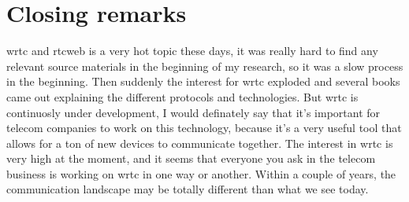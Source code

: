 \section{Closing remarks}
\gls{wrtc} and \gls{rtcweb} is a very hot topic these days, it was really hard to find any relevant source materials in the beginning of my research, so it was a slow process in the beginning. Then suddenly the interest for \gls{wrtc} exploded and several books came out explaining the different protocols and technologies. But \gls{wrtc} is continuosly under development, I would definately say that it's important for telecom companies to work on this technology, because it's a very useful tool that allows for a ton of new devices to communicate together. The interest in \gls{wrtc} is very high at the moment, and it seems that everyone you ask in the telecom business is working on \gls{wrtc} in one way or another. Within a couple of years, the communication landscape may be totally different than what we see today.